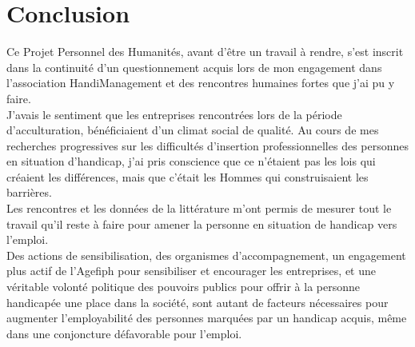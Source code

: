 \chapter{Conclusion}

Ce Projet Personnel des Humanités, avant d'\^etre un travail à rendre, s'est inscrit dans la continuité d'un questionnement acquis lors de mon engagement dans l'association HandiManagement et des rencontres humaines fortes que j'ai pu y faire.\\

J'avais le sentiment que les entreprises rencontrées lors de la période d'acculturation, bénéficiaient d'un climat social de qualité. Au cours de mes recherches progressives sur les difficultés d'insertion professionnelles des personnes en situation d'handicap, j'ai pris conscience que ce n'étaient pas les lois qui créaient les différences, mais que c'était les Hommes qui construisaient les barrières.\\

Les rencontres et les données de la littérature m'ont permis de mesurer tout le travail qu'il reste à faire pour amener la personne en situation de handicap vers l'emploi.\\
Des actions de sensibilisation, des organismes d'accompagnement, un engagement plus actif de l'Agefiph pour sensibiliser et encourager les entreprises, et une véritable volonté politique des pouvoirs publics pour offrir à la personne handicapée une place dans la société, sont autant de facteurs nécessaires pour augmenter l'employabilité des personnes marquées par un handicap acquis, m\^eme dans une conjoncture défavorable pour l'emploi.